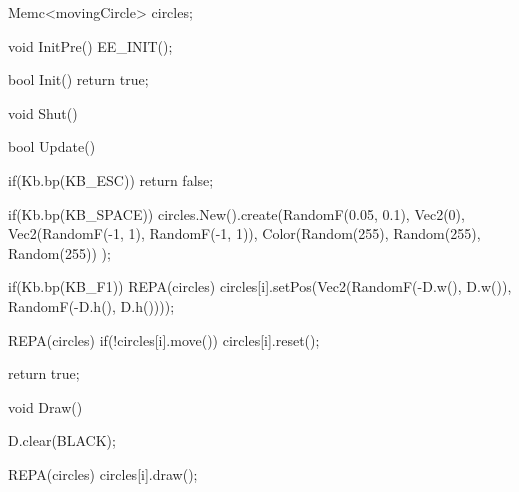 \begin{code}
Memc<movingCircle> circles;

void InitPre()
{
   EE_INIT();
}

bool Init()
{ 
   return true;
}

void Shut() {}

bool Update()
{
   if(Kb.bp(KB_ESC)) return false;
  
   if(Kb.bp(KB_SPACE))
   {
      circles.New().create(RandomF(0.05, 0.1), 
                           Vec2(0), 
                           Vec2(RandomF(-1, 1), RandomF(-1, 1)), 
                           Color(Random(255), Random(255), Random(255))
                           );
   }
   
   if(Kb.bp(KB_F1))
   {
      REPA(circles)
      {
         circles[i].setPos(Vec2(RandomF(-D.w(), D.w()), RandomF(-D.h(), D.h())));
      }
   }
   
   REPA(circles)
   {
      if(!circles[i].move()) circles[i].reset();
   }
   
   return true;
}

void Draw()
{
   D.clear(BLACK);
  
   REPA(circles)
   {
      circles[i].draw();
   }
}
\end{code}
